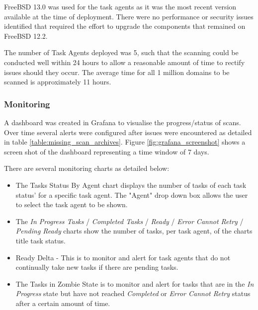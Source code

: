 \documentclass{mscreport}
\begin{document}
\noindent
FreeBSD 13.0 was used for the task agents as it was the most recent version available at the time of deployment. There were no performance or security issues identified that required the effort to upgrade the components that remained on FreeBSD 12.2.

\vspace{0.3cm} \noindent
The number of Task Agents deployed was 5, such that the scanning could be conducted well within 24 hours to allow a reasonable amount of time to rectify issues should they occur. The average time for all 1 million domains to be scanned is approximately 11 hours.


\subsubsection{Monitoring}
\label{section:deployment_monitoring}

A dashboard was created in Grafana to visualise the progress/status of scans. Over time several alerts were configured after issues were encountered as detailed in table \ref{table:missing_scan_archives}. Figure \ref{fig:grafana_screenshot} shows a screen shot of the dashboard representing a time window of 7 days.

\newpage

\vspace{0.3cm} \noindent
There are several monitoring charts as detailed below:
\begin{itemize}
	\setlength\itemsep{0.1em}
    \item The Tasks Status By Agent chart displays the number of tasks of each task status' for a specific task agent. The "Agent" drop down box allows the user to select the task agent to be shown.
    \item The \textit{In Progress Tasks} / \textit{Completed Tasks} / \textit{Ready} / \textit{Error Cannot Retry} / \textit{Pending Ready} charts show the number of tasks, per task agent, of the charts title task status.
    \item Ready Delta - This is to monitor and alert for task agents that do not continually take new tasks if there are pending tasks.
    \item The Tasks in Zombie State is to monitor and alert for tasks that are in the \textit{In Progress} state but have not reached \textit{Completed} or \textit{Error Cannot Retry} status after a certain amount of time.
\end{itemize}
\end{document}
